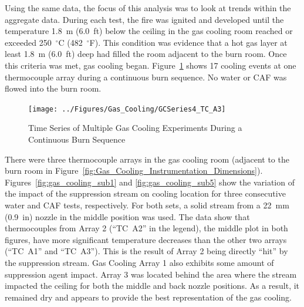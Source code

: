 \documentclass[12pt,oneside]{book}
\begin{document}
Using the same data, the focus of this analysis was to look at trends within the aggregate data. During each test, the fire was ignited and developed until the temperature 1.8~m (6.0~ft) below the ceiling in the gas cooling room reached or exceeded 250~$^{\circ}$C (482~$^{\circ}$F). This condition was evidence that a hot gas layer at least 1.8~m (6.0~ft) deep had filled the room adjacent to the burn room. Once this criteria was met, gas cooling began. Figure~\ref{fig:gas_cooling_exp4} shows 17 cooling events at one thermocouple array during a continuous burn sequence.  No water or CAF was flowed into the burn room.   

\begin{figure}[ht!]
	\texttt{[image: ../Figures/Gas\_Cooling/GCSeries4\_TC\_A3]}
	\caption{Time Series of Multiple Gas Cooling Experiments During a Continuous Burn Sequence}
	\label{fig:gas_cooling_exp4}
\end{figure}

There were three thermocouple arrays in the gas cooling room (adjacent to the burn room in Figure~\ref{fig:Gas_Cooling_Instrumentation_Dimensions}). Figures~\ref{fig:gas_cooling_sub1} and \ref{fig:gas_cooling_sub5} show the variation of the impact of the suppression stream on cooling location for three consecutive water and CAF tests, respectively. For both sets, a solid stream from a 22~mm (0.9~in) nozzle in the middle position was used. The data show that thermocouples from Array 2 (``TC~A2'' in the legend), the middle plot in both figures, have more significant temperature decreases than the other two arrays (``TC~A1'' and ``TC~A3''). This is the result of Array 2 being directly ``hit'' by the suppression stream.  Gas Cooling Array 1 also exhibits some amount of suppression agent impact. Array 3 was located behind the area where the stream impacted the ceiling for both the middle and back nozzle positions. As a result, it remained dry and appears to provide the best representation of the gas cooling.
\end{document}
